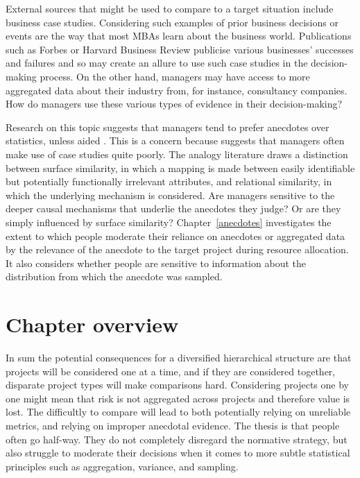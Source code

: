 \documentclass[a4paper, nobind, dvipsnames]{templates/ociamthesis}
\theoremstyle{definition}
\theoremstyle{definition}
\theoremstyle{definition}
\theoremstyle{definition}
\theoremstyle{remark}
\begin{document}
External sources that might be used to compare to a target situation include
business case studies. Considering such examples of prior business decisions or
events are the way that most MBAs learn about the business world. Publications
such as Forbes or Harvard Business Review publicise various businesses'
successes and failures and so may create an allure to use such case studies in
the decision-making process. On the other hand, managers may have access to more
aggregated data about their industry from, for instance, consultancy companies.
How do managers use these various types of evidence in their decision-making?

Research on this topic suggests that managers tend to prefer anecdotes over
statistics, unless aided \autocite{wainberg2018}. This is a concern because \textcite{gavetti2005}
suggests that managers often make use of case studies quite poorly. The analogy
literature draws a distinction between surface similarity, in which a mapping is
made between easily identifiable but potentially functionally irrelevant
attributes, and relational similarity, in which the underlying mechanism is
considered. Are managers sensitive to the deeper causal mechanisms that underlie
the anecdotes they judge? Or are they simply influenced by surface similarity?
Chapter~\ref{anecdotes} investigates the extent to which people moderate their
reliance on anecdotes or aggregated data by the relevance of the anecdote to the
target project during resource allocation. It also considers whether people are
sensitive to information about the distribution from which the anecdote was
sampled.

\section{Chapter overview}

In sum the potential consequences for a diversified hierarchical structure are
that projects will be considered one at a time, and if they are considered
together, disparate project types will make comparisons hard. Considering
projects one by one might mean that risk is not aggregated across projects and
therefore value is lost. The difficultly to compare will lead to both
potentially relying on unreliable metrics, and relying on improper anecdotal
evidence. The thesis is that people often go half-way. They do not completely
disregard the normative strategy, but also struggle to moderate their decisions
when it comes to more subtle statistical principles such as aggregation,
variance, and sampling.
\end{document}
